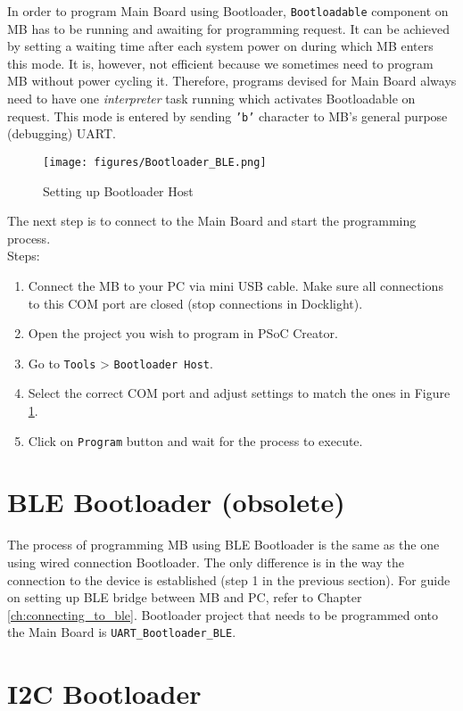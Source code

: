 In order to program Main Board using Bootloader, \texttt{Bootloadable} component on MB has to be running and awaiting for programming request. It can be achieved by setting a waiting time after each system power on during which MB enters this mode. It is, however, not efficient because we sometimes need to program MB without power cycling it. Therefore, programs devised for Main Board always need to have one \textit{interpreter} task running which activates Bootloadable on request. This mode is entered by sending \texttt{'b'} character to MB's general purpose (debugging) UART.

\begin{figure}[htb]
    \centering
	  \texttt{[image: figures/Bootloader\_BLE.png]}
	\caption{Setting up Bootloader Host}
	\label{fig:bootloader_host}
\end{figure}

The next step is to connect to the Main Board and start the programming process.\\
Steps:
\begin{enumerate}
	\item Connect the MB to your PC via mini USB cable. Make sure all connections to this COM port are closed (stop connections in Docklight).
	\item Open the project you wish to program in PSoC Creator.
	\item Go to \texttt{Tools} > \texttt{Bootloader Host}.
	\item Select the correct COM port and adjust settings to match the ones in Figure \ref{fig:bootloader_host}.
	\item Click on \texttt{Program} button and wait for the process to execute.
\end{enumerate}

\section{BLE Bootloader (obsolete)}

The process of programming MB using BLE Bootloader is the same as the one using wired connection Bootloader.
The only difference is in the way the connection to the device is established (step 1 in the previous section).
For guide on setting up BLE bridge between MB and PC, refer to Chapter \ref{ch:connecting_to_ble}.
Bootloader project that needs to be programmed onto the Main Board is \texttt{UART\_Bootloader\_BLE}.

\section{I2C Bootloader}


